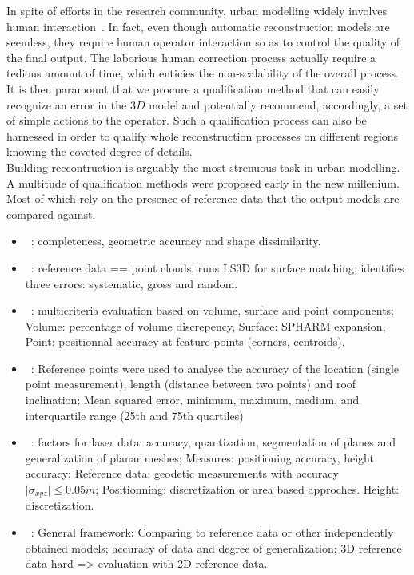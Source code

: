 \documentclass[../main.tex]{subfiles}
\begin{document}
    In spite of efforts in the research community, urban modelling widely involves human interaction~\cite{Musialski2012}. In fact, even though automatic reconstruction models are seemless, they require human operator interaction so as to control the quality of the final output. The laborious human correction process actually require a tedious amount of time, which enticies the non-scalability of the overall process. It is then paramount that we procure a qualification method that can easily recognize an error in the $3D$ model and potentially recommend, accordingly, a set of simple actions to the operator. Such a qualification process can also be harnessed in order to qualify whole reconstruction processes on different regions knowing the coveted degree of details.\\

    Building reccontruction is arguably the most strenuous task in urban modelling. A multitude of qualification methods were proposed early in the new millenium. Most of which rely on the presence of reference data that the output models are compared against.
    \begin{itemize}
        \item ~\cite{Henricsson1997}: completeness, geometric accuracy and shape dissimilarity.
        \item ~\cite{Akca2010}: reference data == point clouds; runs LS3D for surface matching; identifies three errors: systematic, gross and random.
        \item ~\cite{Zeng2014}: multicriteria evaluation based on volume, surface and point components; Volume: percentage of volume discrepency, Surface: SPHARM expansion, Point: positionnal accuracy at feature points (corners, centroids).
        \item ~\cite{Kaartinen2005}: Reference points were used to analyse the accuracy of the location (single point measurement), length (distance between two points) and roof inclination; Mean squared error, minimum, maximum, medium, and interquartile range (25th and 75th quartiles)
        \item ~\cite{Voegtle2003}: factors for laser data: accuracy, quantization, segmentation of planes and generalization of planar meshes; Measures: positioning accuracy, height accuracy; Reference data: geodetic measurements with accuracy $ \vert \sigma_{xyz} \vert \leq 0.05 m $; Positionning: discretization or area based approches. Height: discretization.
        \item ~\cite{Schuster2003}: General framework: Comparing to reference data or other independently obtained models; accuracy of data and degree of generalization; 3D reference data hard => evaluation with 2D reference data.
    \end{itemize}
\end{document}
